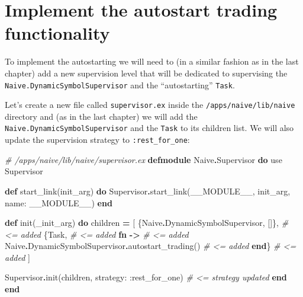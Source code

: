 \documentclass[
  oneside]{book}
\newenvironment{Shaded}{\begin{snugshade}}{\end{snugshade}}
\newcommand{\CommentTok}[1]{\textcolor[rgb]{0.56,0.35,0.01}{\textit{#1}}}
\newcommand{\ConstantTok}[1]{\textcolor[rgb]{0.00,0.00,0.00}{#1}}
\newcommand{\ImportTok}[1]{#1}
\newcommand{\KeywordTok}[1]{\textcolor[rgb]{0.13,0.29,0.53}{\textbf{#1}}}
\newcommand{\NormalTok}[1]{#1}
\newcommand{\OperatorTok}[1]{\textcolor[rgb]{0.81,0.36,0.00}{\textbf{#1}}}
\newcommand{\VariableTok}[1]{\textcolor[rgb]{0.00,0.00,0.00}{#1}}
\begin{document}
\hypertarget{implement-the-autostart-trading-functionality}{%
\section{Implement the autostart trading functionality}\label{implement-the-autostart-trading-functionality}}

To implement the autostarting we will need to (in a similar fashion as in the last chapter) add a new supervision level that will be dedicated to supervising the \texttt{Naive.DynamicSymbolSupervisor} and the ``autostarting'' \texttt{Task}.

Let's create a new file called \texttt{supervisor.ex} inside the \texttt{/apps/naive/lib/naive} directory and (as in the last chapter) we will add the \texttt{Naive.DynamicSymbolSupervisor} and the \texttt{Task} to its children list. We will also update the supervision strategy to \texttt{:rest\_for\_one}:

\begin{Shaded}
\begin{Highlighting}[]
\CommentTok{\# /apps/naive/lib/naive/supervisor.ex}
\KeywordTok{defmodule} \ConstantTok{Naive}\OperatorTok{.}\ConstantTok{Supervisor} \KeywordTok{do}
  \ImportTok{use} \ConstantTok{Supervisor}

  \KeywordTok{def}\NormalTok{ start\_link(init\_arg) }\KeywordTok{do}
    \ConstantTok{Supervisor}\OperatorTok{.}\NormalTok{start\_link(}\ConstantTok{\_\_MODULE\_\_}\NormalTok{, init\_arg, }\VariableTok{name:} \ConstantTok{\_\_MODULE\_\_}\NormalTok{)}
  \KeywordTok{end}

  \KeywordTok{def}\NormalTok{ init(\_init\_arg) }\KeywordTok{do}
\NormalTok{    children }\OperatorTok{=}\NormalTok{ [}
\NormalTok{      \{}\ConstantTok{Naive}\OperatorTok{.}\ConstantTok{DynamicSymbolSupervisor}\NormalTok{, []\},                 }\CommentTok{\# \textless{}= added}
\NormalTok{      \{}\ConstantTok{Task}\NormalTok{,                                               }\CommentTok{\# \textless{}= added}
       \KeywordTok{fn} \OperatorTok{{-}\textgreater{}}                                               \CommentTok{\# \textless{}= added}
         \ConstantTok{Naive}\OperatorTok{.}\ConstantTok{DynamicSymbolSupervisor}\OperatorTok{.}\NormalTok{autostart\_trading() }\CommentTok{\# \textless{}= added}
       \KeywordTok{end}\NormalTok{\}                                                }\CommentTok{\# \textless{}= added}
\NormalTok{    ]}

    \ConstantTok{Supervisor}\OperatorTok{.}\NormalTok{init(children, }\VariableTok{strategy:} \VariableTok{:rest\_for\_one}\NormalTok{) }\CommentTok{\# \textless{}= strategy updated}
  \KeywordTok{end}
\KeywordTok{end}
\end{Highlighting}
\end{Shaded}
\end{document}
